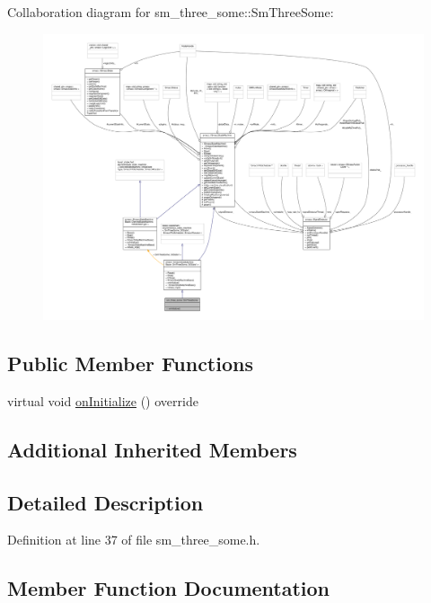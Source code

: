 Collaboration diagram for sm\+\_\+three\+\_\+some\+:\+:Sm\+Three\+Some\+:
\nopagebreak
\begin{figure}[H]
\begin{center}
\leavevmode
\includegraphics[width=350pt]{structsm__three__some_1_1SmThreeSome__coll__graph}
\end{center}
\end{figure}
\subsection*{Public Member Functions}
\begin{DoxyCompactItemize}
\item 
virtual void \hyperlink{structsm__three__some_1_1SmThreeSome_ac811ac731023ccbab1db358d0efa1c0e}{on\+Initialize} () override
\end{DoxyCompactItemize}
\subsection*{Additional Inherited Members}


\subsection{Detailed Description}


Definition at line 37 of file sm\+\_\+three\+\_\+some.\+h.



\subsection{Member Function Documentation}
